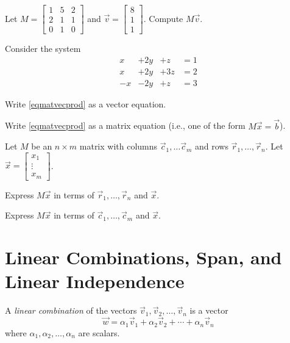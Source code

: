 \documentclass[14pt]{problemset}
\newcommand{\mat}[1]{\begin{bmatrix}#1\end{bmatrix}}
\begin{document}
	\question
	\begin{parts}
		\item Let $M=\mat{1&5&2\\2&1&1\\0&1&0}$ and $\vec v=\mat{8\\1\\1}$. Compute $M\vec v$.
	\end{parts}

	\question
		Consider the system
		\begin{equation}\label{eqmatvecprod}
			\begin{array}{llll}
				x&+2y&+z &= 1\\
				x&+2y&+3z &= 2\\
				-x&-2y&+z &= 3
			\end{array}
		\end{equation}
		\begin{parts}
			\item Write \eqref{eqmatvecprod} as a vector equation.
			\item Write \eqref{eqmatvecprod} as a matrix equation (i.e., one of the form $M\vec x=\vec b$).
		\end{parts}

	\question
	Let $M$ be an $n\times m$ matrix with columns $\vec c_1,\ldots \vec c_m$ and rows $\vec r_1,\ldots,\vec r_n$.
	Let $\vec x=\mat{x_1\\\vdots\\ x_m}$.
	\begin{parts}
		\item Express $M\vec x$ in terms of $\vec r_1,\ldots,\vec r_n$ and $\vec x$.
		\item Express $M\vec x$ in terms of $\vec c_1,\ldots,\vec c_m$ and $\vec x$.
	\end{parts}





\section*{Linear Combinations, Span, and Linear Independence}
	\vspace{-1em}

	\begin{definition}
		A \emph{linear combination} of the vectors $\vec v_1,\vec v_2,\ldots,\vec v_n$ is
		a vector
		\[
			\vec w = \alpha_1\vec v_1+\alpha_2\vec v_2+\cdots+\alpha_n\vec v_n
		\]
		where $\alpha_1,\alpha_2,\ldots,\alpha_n$ are scalars.
	\end{definition}
\end{document}

